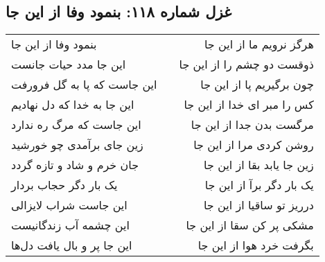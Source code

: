 \begin{center}
\section*{غزل شماره ۱۱۸: بنمود وفا از این جا}
\label{sec:0118}
\begin{longtable}{l p{0.5cm} r}
بنمود وفا از این جا
&&
هرگز نرویم ما از این جا
\\
این جا مدد حیات جانست
&&
ذوقست دو چشم را از این جا
\\
این جاست که پا به گل فرورفت
&&
چون برگیریم پا از این جا
\\
این جا به خدا که دل نهادیم
&&
کس را مبر ای خدا از این جا
\\
این جاست که مرگ ره ندارد
&&
مرگست بدن جدا از این جا
\\
زین جای برآمدی چو خورشید
&&
روشن کردی مرا از این جا
\\
جان خرم و شاد و تازه گردد
&&
زین جا یابد بقا از این جا
\\
یک بار دگر حجاب بردار
&&
یک بار دگر برآ از این جا
\\
این جاست شراب لایزالی
&&
درریز تو ساقیا از این جا
\\
این چشمه آب زندگانیست
&&
مشکی پر کن سقا از این جا
\\
این جا پر و بال یافت دل‌ها
&&
بگرفت خرد هوا از این جا
\\
\end{longtable}
\end{center}
